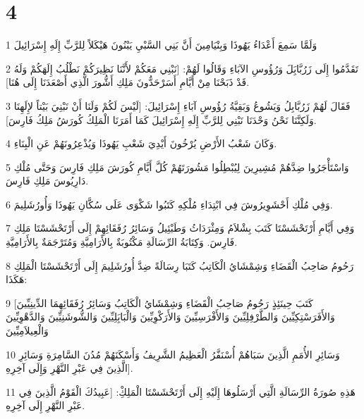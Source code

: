 \chapter{4}

\par 1 وَلَمَّا سَمِعَ أَعْدَاءُ يَهُوذَا وَبِنْيَامِينَ أَنَّ بَنِي السَّبْيِ يَبْنُونَ هَيْكَلاً لِلرَّبِّ إِلَهِ إِسْرَائِيلَ
\par 2 تَقَدَّمُوا إِلَى زَرُبَّابَِلَ وَرُؤُوسِ الآبَاءِ وَقَالُوا لَهُمْ: [نَبْنِي مَعَكُمْ لأَنَّنَا نَظِيرَكُمْ نَطْلُبُ إِلَهَكُمْ وَلَهُ قَدْ ذَبَحْنَا مِنْ أَيَّامِ أَسَرْحَدُّونَ مَلِكِ أَشُّورَ الَّذِي أَصْعَدَنَا إِلَى هُنَا].
\par 3 فَقَالَ لَهُمْ زَرُبَّابِلُ وَيَشُوعُ وَبَقِيَّةُ رُؤُوسِ آبَاءِ إِسْرَائِيلَ: [لَيْسَ لَكُمْ وَلَنَا أَنْ نَبْنِيَ بَيْتاً لإِلَهِنَا وَلَكِنَّنَا نَحْنُ وَحْدَنَا نَبْنِي لِلرَّبِّ إِلَهِ إِسْرَائِيلَ كَمَا أَمَرَنَا الْمَلِكُ كُورَشُ مَلِكُ فَارِسَ].
\par 4 وَكَانَ شَعْبُ الأَرْضِ يُرْخُونَ أَيْدِيَ شَعْبِ يَهُوذَا وَيُذْعِرُونَهُمْ عَنِ الْبِنَاءِ.
\par 5 وَاسْتَأْجَرُوا ضِدَّهُمْ مُشِيرِينَ لِيُبْطِلُوا مَشُورَتَهُمْ كُلَّ أَيَّامِ كُورَشَ مَلِكِ فَارِسَ وَحَتَّى مُلْكِ دَارِيُوسَ مَلِكِ فَارِسَ.
\par 6 وَفِي مُلْكِ أَحْشَوِيرُوشَ فِي ابْتِدَاءِ مُلْكِهِ كَتَبُوا شَكْوَى عَلَى سُكَّانِ يَهُوذَا وَأُورُشَلِيمَ.
\par 7 وَفِي أَيَّامِ أَرْتَحْشَسْتَا كَتَبَ بِشْلاَمُ وَمِثْرَدَاثُ وَطَبْئِيلُ وَسَائِرُ رُفَقَائِهِمْ إِلَى أَرْتَحْشَسْتَا مَلِكِ فَارِسَ. وَكِتَابَةُ الرِّسَالَةِ مَكْتُوبَةٌ بِالأَرَامِيَّةِ وَمُتَرْجَمَةٌ بِالأَرَامِيَّةِ.
\par 8 رَحُومُ صَاحِبُ الْقَضَاءِ وَشِمْشَايُ الْكَاتِبُ كَتَبَا رِسَالَةً ضِدَّ أُورُشَلِيمَ إِلَى أَرْتَحْشَسْتَا الْمَلِكِ هَكَذَا:
\par 9 [كَتَبَ حِينَئِذٍ رَحُومُ صَاحِبُ الْقَضَاءِ وَشِمْشَايُ الْكَاتِبُ وَسَائِرُ رُفَقَائِهِمَا الدِّينِيِّينَ وَالأَفَرَسْتِكِيِّينَ وَالطَّرْفِلِيِّينَ وَالأَفْرَسِيِّينَ وَالأَرَكْوِيِّينَ وَالْبَابَِلِيِّينَ وَالشُّوشَنِيِّينَ وَالدَّهْوِيِّينَ وَالْعِيلاَمِيِّينَ
\par 10 وَسَائِرِ الأُمَمِ الَّذِينَ سَبَاهُمْ أُسْنَفَّرُ الْعَظِيمُ الشَّرِيفُ وَأَسْكَنَهُمْ مُدُنَ السَّامِرَةِ وَسَائِرِ الَّذِينَ فِي عَبْرِ النَّهْرِ وَإِلَى آخِرِهِ].
\par 11 هَذِهِ صُورَةُ الرِّسَالَةِ الَّتِي أَرْسَلُوهَا إِلَيْهِ إِلَى أَرْتَحْشَسْتَا الْمَلِكِْ: [عَبِيدُكَ الْقَوْمُ الَّذِينَ فِي عَبْرِ النَّهْرِ إِلَى آخِرِهِ.
